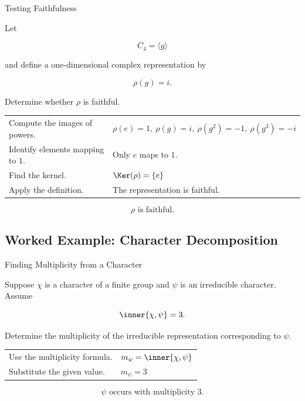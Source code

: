 \begin{workedexamplebox}{Testing Faithfulness}

Let

\[ C_4=\langle g\rangle \]

and define a one-dimensional complex representation by

\[ \rho(g)=i. \]

Determine whether \(\rho\) is faithful.

\begin{tabularx}{\textwidth}{@{}>{\raggedright\arraybackslash}p{}X@{}}
Compute the images of powers. &
\(\rho(e)=1,\ \rho(g)=i,\ \rho(g^2)=-1,\ \rho(g^3)=-i\)\\
Identify elements mapping to \(1\). & Only \(e\) maps to \(1\).\\
Find the kernel. & \(\Ker(\rho)=\{e\}\)\\
Apply the definition. & The representation is faithful.
\end{tabularx}

\begin{answerbox}
\[ \boxed{\rho\text{ is faithful}.} \]
\end{answerbox}
\end{workedexamplebox}

\subsection{Worked Example: Character Decomposition}
\label{subsec:worked-character-decomposition}

\begin{workedexamplebox}{Finding Multiplicity from a Character}

Suppose \(\chi\) is a character of a finite group and \(\psi\) is an
irreducible character. Assume

\[ \inner{\chi,\psi}=3. \]

Determine the multiplicity of the irreducible representation corresponding
to \(\psi\).

\begin{tabularx}{\textwidth}{@{}>{\raggedright\arraybackslash}p{}X@{}}
Use the multiplicity formula. & \(m_\psi=\inner{\chi,\psi}\)\\
Substitute the given value. & \(m_\psi=3\)
\end{tabularx}

\begin{answerbox}
\[ \boxed{\psi\text{ occurs with multiplicity }3.} \]
\end{answerbox}
\end{workedexamplebox}


